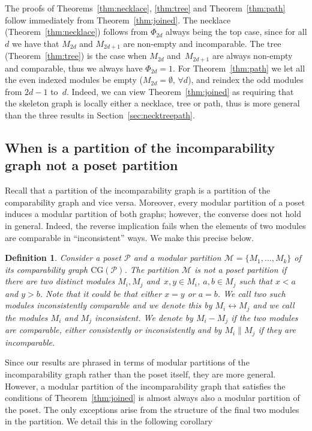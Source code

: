 \documentclass[9pt,a4paper,oneside]{article}
\newtheorem{definition}[theorem]{Definition}
\newcommand{\cM}{\mathcal{M}}
\newcommand{\cP}{\mathcal{P}}
\newcommand{\CG}{\mathrm{CG}}
\begin{document}
The proofs of Theorems~\ref{thm:necklace}, \ref{thm:tree} and Theorem~\ref{thm:path} follow immediately from Theorem~\ref{thm:joined}.
The necklace (Theorem~\ref{thm:necklace}) follows from $\Phi_{2d}$ always being the top case, since for all $d$ we have that $M_{2d}$ and $M_{2d+1}$ are non-empty and incomparable. The tree (Theorem~\ref{thm:tree}) is the case when $M_{2d}$ and~$M_{2d+1}$ are always non-empty and comparable, thus we always have $\Phi_{2d}=1$. For Theorem~\ref{thm:path} we let all the even indexed modules be empty ($M_{2d}=\emptyset,\,\forall d$), and reindex the odd modules from $2d-1$ to~$d$. 
Indeed, we can view Theorem~\ref{thm:joined} as requiring that the skeleton graph is locally either a necklace, tree or path, thus is more general than the three results in Section~\ref{sec:necktreepath}.





\subsection{When is a partition of the incomparability graph not a poset partition}\label{sec:notposet}

Recall that a partition of the incomparability graph is a partition of the comparability graph and vice versa. Moreover, every modular partition of a poset induces a modular partition of both graphs; however, the converse does not hold in general. Indeed, the reverse implication fails when the elements of two modules are comparable in ``inconsistent'' ways. We make this precise below.

\begin{definition}
Consider a poset $\cP$ and a modular partition $\cM=\{M_1,\ldots,M_k\}$  of its comparability graph $\CG(\cP)$. The partition $\cM$ is not a poset partition if there are two distinct modules $M_i, M_j$ and~$x,y \in M_i$, $a,b\in M_j$ such that $x<a$ and $y>b$.  Note that it could be that either $x=y$ or $a=b$.
We call two such modules \emph{inconsistently comparable} and we denote this by $M_i\leftrightarrow M_j$ and we call the modules $M_i$ and $M_j$ \emph{inconsistent}.
We denote by $M_i-M_j$ if the two modules are comparable, either consistently or inconsistently and by $M_i\parallel M_j$ if they are incomparable.
\end{definition}

Since our results are phrased in terms of modular partitions of the incomparability graph rather than the poset itself, they are more general. However, a modular partition of the incomparability graph that satisfies the conditions of Theorem~\ref{thm:joined} is almost always also a modular partition of the poset. The only exceptions arise from the structure of the final two modules in the partition. We detail this in the following corollary 
\end{document}
